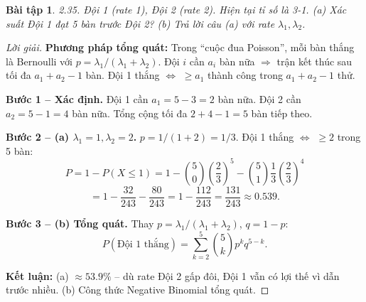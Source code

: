 \documentclass[8pt,a4paper]{article}
\newtheorem{exercise}{Bài tập}
\newenvironment{solution}{\begin{proof}[Lời giải]}{\end{proof}}
\begin{document}
\begin{exercise}
2.35. Đội 1 (rate 1), Đội 2 (rate 2). Hiện tại tỉ số là 3-1. 
(a) Xác suất Đội 1 đạt 5 bàn trước Đội 2?
(b) Trả lời câu (a) với rate $\lambda_1, \lambda_2$.
\end{exercise}
\begin{solution}
\textbf{Phương pháp tổng quát:} Trong ``cuộc đua Poisson'', mỗi bàn thắng là Bernoulli với $p = \lambda_1/(\lambda_1+\lambda_2)$. Đội $i$ cần $a_i$ bàn nữa $\Rightarrow$ trận kết thúc sau tối đa $a_1+a_2-1$ bàn. Đội 1 thắng $\Leftrightarrow$ $\geq a_1$ thành công trong $a_1+a_2-1$ thử.

\textbf{Bước 1 -- Xác định.} Đội 1 cần $a_1 = 5-3 = 2$ bàn nữa. Đội 2 cần $a_2 = 5-1 = 4$ bàn nữa. Tổng cộng tối đa $2+4-1 = 5$ bàn tiếp theo.

\textbf{Bước 2 -- (a) $\lambda_1 = 1, \lambda_2 = 2$.} $p = 1/(1+2) = 1/3$. Đội 1 thắng $\Leftrightarrow$ $\geq 2$ trong 5 bàn:
\[
  P = 1 - P(X \leq 1) = 1 - \binom{5}{0}\left(\frac{2}{3}\right)^5 - \binom{5}{1}\frac{1}{3}\left(\frac{2}{3}\right)^4
\]
\[
  = 1 - \frac{32}{243} - \frac{80}{243} = 1 - \frac{112}{243} = \frac{131}{243} \approx \boxed{0.539}.
\]

\textbf{Bước 3 -- (b) Tổng quát.} Thay $p = \lambda_1/(\lambda_1+\lambda_2)$, $q = 1-p$:
\[
  \boxed{P(\text{Đội 1 thắng}) = \sum_{k=2}^{5} \binom{5}{k} p^k q^{5-k}}.
\]

\textbf{Kết luận:} (a) $\approx 53.9\%$ -- dù rate Đội 2 gấp đôi, Đội 1 vẫn có lợi thế vì dẫn trước nhiều. (b) Công thức Negative Binomial tổng quát.
\end{solution}
\end{document}
